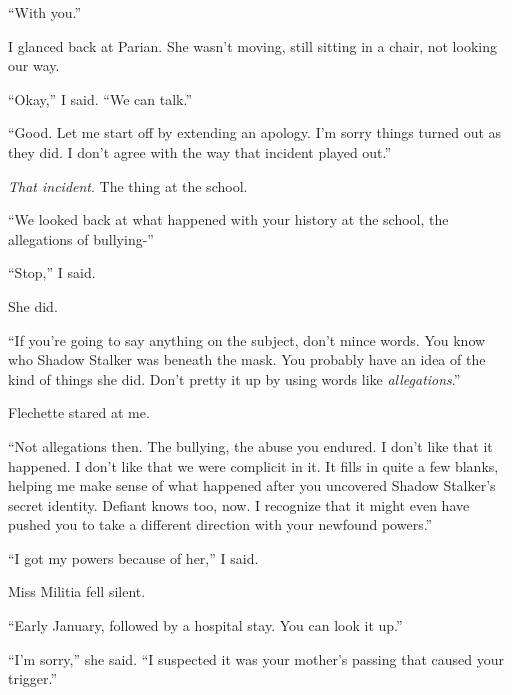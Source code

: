 ``With you.''



I glanced back at Parian.  She wasn't moving, still sitting in a chair, not looking our way.



``Okay,'' I said.  ``We can talk.''



``Good.  Let me start off by extending an apology.  I'm sorry things turned out as they did.  I don't agree with the way that incident played out.''



\emph{That incident}.  The thing at the school.



``We looked back at what happened with your history at the school, the allegations of bullying-''



``Stop,'' I said.



She did.



``If you're going to say anything on the subject, don't mince words.  You know who Shadow Stalker was beneath the mask.  You probably have an idea of the kind of things she did.  Don't pretty it up by using words like \emph{allegations}.''



Flechette stared at me.



``Not allegations then.  The bullying, the abuse you endured.  I don't like that it happened.  I don't like that we were complicit in it.  It fills in quite a few blanks, helping me make sense of what happened after you uncovered Shadow Stalker's secret identity.  Defiant knows too, now.  I recognize that it might even have pushed you to take a different direction with your newfound powers.''



``I got my powers because of her,'' I said.



Miss Militia fell silent.



``Early January, followed by a hospital stay.  You can look it up.''



``I'm sorry,'' she said.  ``I suspected it was your mother's passing that caused your trigger.''



